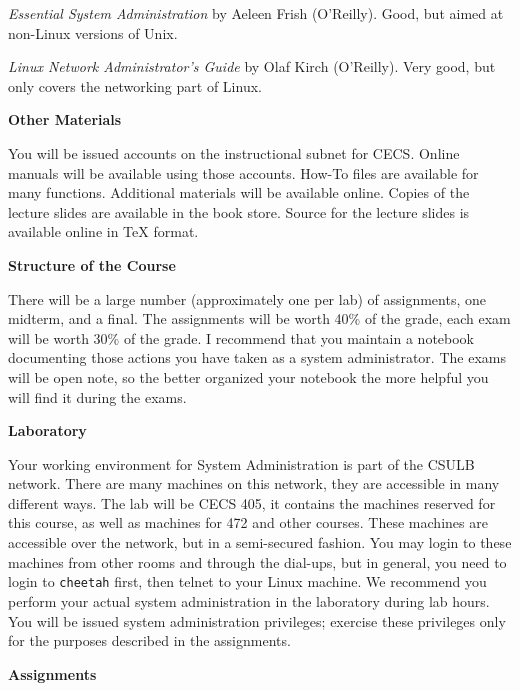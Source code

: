 
{\it Essential System Administration} by Aeleen Frish (O'Reilly).
Good, but aimed at non-Linux versions of Unix.

{\it Linux Network Administrator's Guide} by Olaf Kirch (O'Reilly).
Very good, but only covers the networking part of Linux.

\vskip 5pt
\centerline{\bf Other Materials}

You will be issued accounts on the instructional subnet for CECS.
Online manuals will be available using those accounts.
How-To files are available for many functions.
Additional materials will be available online.
Copies of the lecture slides are available in the book store.
Source for the lecture slides is available online in TeX format.

\vskip 5pt
\centerline{\bf Structure of the Course}
 
There will be a large number (approximately one per lab) of 
assignments, one midterm, and a final.
The assignments will be worth 40\% of the grade,
each exam will be worth 30\% of the grade.
I recommend that you maintain a notebook documenting those actions
you have taken as a system administrator.
The exams will be open note, so the better organized your notebook
the more helpful you will find it during the exams.

\vskip 5pt
\centerline{\bf Laboratory}

Your working environment for System Administration is part of the CSULB network.
There are many machines on this network, they are accessible in
many different ways.
The lab will be CECS 405, it contains the machines reserved for this course,
as well as machines for 472 and other courses.
These machines are accessible over the network,
but in a semi-secured fashion.
You may login to these machines from other rooms
and through the dial-ups, but in general, you need to login to {\tt cheetah}
first, then telnet to your Linux machine.
We recommend you perform your actual system administration in the laboratory
during lab hours.
You will be issued system administration privileges;
exercise these privileges only for the purposes described in the assignments.

\vfill\eject
\centerline{\bf Assignments}

